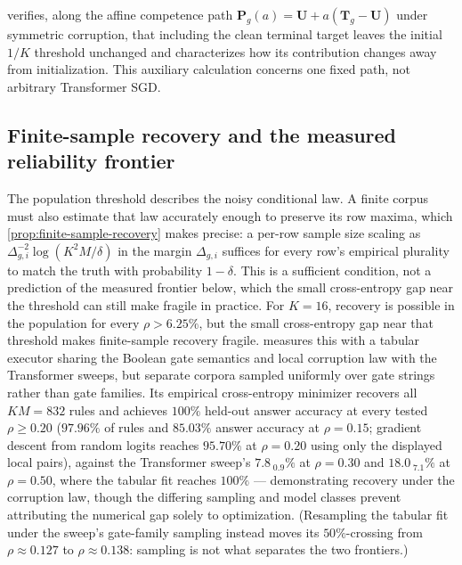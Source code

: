 \label{sec:outcome-rescue}
 verifies, along the affine competence
path $\bm{P}_g(a)=\bm{U}+a(\bm{T}_g-\bm{U})$ under symmetric corruption,
that including the clean terminal target leaves the initial $1/K$
threshold unchanged and characterizes how its contribution changes away
from initialization. This auxiliary calculation concerns one fixed path,
not arbitrary Transformer SGD.

\subsection{Finite-sample recovery and the measured reliability frontier}
\label{sec:identifiability}

The population threshold describes the noisy conditional law. A finite corpus
must also estimate that law accurately enough to preserve its row maxima,
which \cref{prop:finite-sample-recovery} makes precise: a per-row sample
size scaling as $\Delta_{g,i}^{-2}\log(K^2M/\delta)$ in the margin
$\Delta_{g,i}$ suffices for every row's empirical plurality to match the
truth with probability $1-\delta$. This is a sufficient condition, not a
prediction of the measured frontier below, which the small cross-entropy
gap near the threshold can still make fragile in practice.
For $K=16$, recovery is possible in the population for every $\rho>6.25\%$,
but the small cross-entropy gap near that threshold makes finite-sample
recovery fragile.  measures this with a tabular
executor sharing the Boolean gate semantics and local corruption law with
the Transformer sweeps, but separate corpora sampled uniformly over gate
strings rather than gate families. Its empirical cross-entropy minimizer
recovers all $KM=832$ rules and achieves $100\%$ held-out answer accuracy
at every tested $\rho\ge0.20$ ($97.96\%$ of rules and $85.03\%$ answer
accuracy at $\rho=0.15$; gradient descent from random logits reaches
$95.70\%$ at $\rho=0.20$ using only the displayed local pairs), against
the Transformer sweep's $7.8_{\;\text{0.9}}\%$ at $\rho=0.30$ and
$18.0_{\;\text{7.1}}\%$ at $\rho=0.50$, where the tabular fit reaches
$100\%$ --- demonstrating recovery under the corruption law, though the
differing sampling and model classes prevent attributing the numerical
gap solely to optimization. (Resampling the tabular fit under the sweep's
gate-family sampling instead moves its $50\%$-crossing from
$\rho\approx0.127$ to $\rho\approx0.138$: sampling is not what separates
the two frontiers.)

